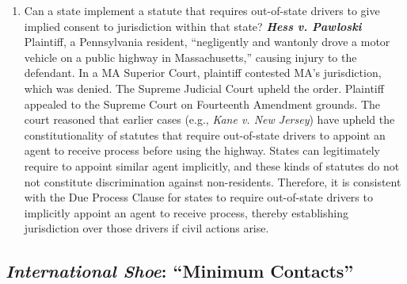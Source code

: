 \begin{enumerate}
    \item Can a state implement a statute that requires out-of-state drivers to give implied consent to jurisdiction within that state? \textbf{\emph{Hess v. Pawloski}} Plaintiff, a Pennsylvania resident, ``negligently and wantonly drove a motor vehicle on a public highway in Massachusetts,'' causing injury to the defendant. In a MA Superior Court, plaintiff contested MA's jurisdiction, which was denied. The Supreme Judicial Court upheld the order. Plaintiff appealed to the Supreme Court on Fourteenth Amendment grounds. The court reasoned that earlier cases (e.g., \emph{Kane v. New Jersey}) have upheld the constitutionality of statutes that require out-of-state drivers to appoint an agent to receive process before using the highway. States can legitimately require to appoint similar agent implicitly, and these kinds of statutes do not not constitute discrimination against non-residents. Therefore, it is consistent with the Due Process Clause for states to require out-of-state drivers to implicitly appoint an agent to receive process, thereby establishing jurisdiction over those drivers if civil actions arise.
\end{enumerate}

\subsection{\emph{International Shoe}: ``Minimum Contacts''}

